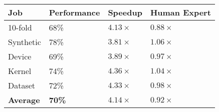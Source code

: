\begin{tabular}{llll}
  \toprule
  Job & Performance & Speedup & Human Expert \\
  \midrule
  10-fold & 68\% &       $4.13\times$ &       $0.88\times$ \\
  Synthetic & 78\% &       $3.81\times$ &       $1.06\times$ \\
  Device & 69\% &       $3.89\times$ &       $0.97\times$ \\
  Kernel & 74\% &       $4.36\times$ &       $1.04\times$ \\
  Dataset & 72\% &       $4.33\times$ &       $0.98\times$ \\
  \textbf{Average} &  \textbf{70\%} &  $\bm{4.14\times}$ &  $\bm{0.92\times}$ \\
  \bottomrule
\end{tabular}

